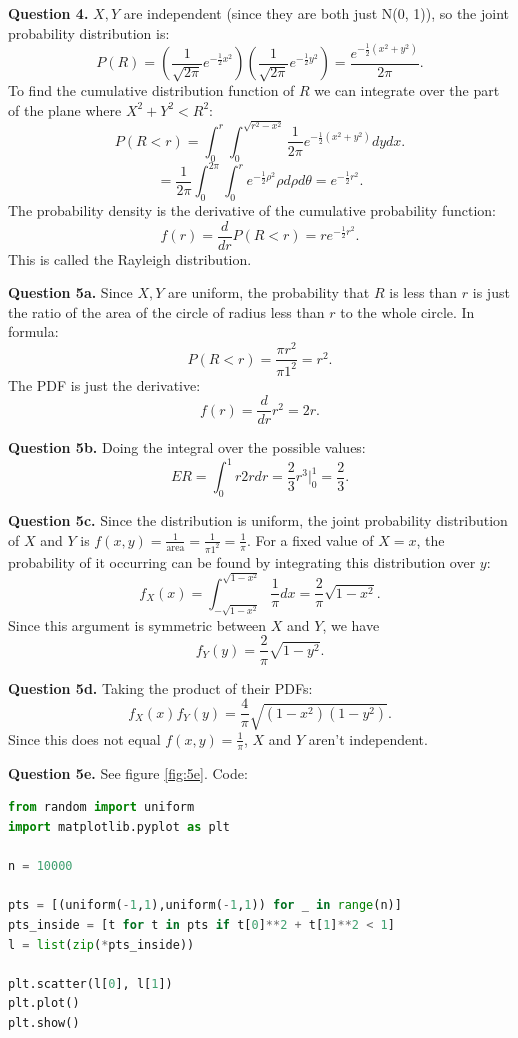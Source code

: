 \documentclass[letterpaper, reqno,11pt]{article}
\begin{document}
{\medskip\noindent\bf Question 4.} $X,Y$ are independent (since they are both just N(0, 1)), so the joint probability distribution is: 
\[
    P(R)=\left(\frac{1}{\sqrt{2\pi} }e^{-\frac{1}{2}x^2}\right)\left(\frac{1}{\sqrt{2\pi} }e^{-\frac{1}{2}y^2}\right)=\frac{e^{-\frac{1}{2}(x^2+y^2)}}{2\pi}
.\]
To find the cumulative distribution function of $R$ we can integrate over the part of the plane where $X^2+Y^2<R^2$: 
\[
    P(R<r)=\int_0^{r}\int_0^{\sqrt{ r^2-x^2}}\frac{1}{2\pi}e^{-\frac{1}{2}\left( x^2+y^2 \right) }dydx
.\]
\[
    =\frac{1}{2\pi}\int_0^{2\pi}\int_0^{r}e^{-\frac{1}{2}\rho^2}\rho d\rho d\theta=e^{-\frac{1}{2}r^2}
.\]
The probability density is the derivative of the cumulative probability function: 
\[
f(r)=\frac{d}{dr}P(R<r)=re^{-\frac{1}{2}r^2}
.\]
This is called the Rayleigh distribution. 

{\medskip\noindent\bf Question 5a.} Since $X,Y$ are uniform, the probability that $R$ is less than $r$ is just the ratio of the area of the circle of radius less than $r$ to the whole circle. In formula: 
\[
P(R<r)=\frac{\pi r^2}{\pi 1^2}=r^2
.\]
The PDF is just the derivative:
\[
f(r)=\frac{d}{dr} r^2=2r
.\]

{\medskip\noindent\bf Question 5b.} Doing the integral over the possible values: 
\[
ER=\int_0^{1}r 2r dr=\frac{2}{3}r^{3}\bigg|_0^{1}=\frac{2}{3}
.\]

{\medskip\noindent\bf Question 5c.} Since the distribution is uniform, the joint probability distribution of $X$ and $Y$ is $f(x, y)=\frac{1}{\text{area}}=\frac{1}{\pi 1^2}=\frac{1}{\pi}$. For a fixed value of $X=x$, the probability of it occurring can be found by integrating this distribution over $y$: 
\[
f_X(x)=\int_{-\sqrt{1-x^2} }^{\sqrt{1-x^2} }\frac{1}{\pi}dx=\frac{2}{\pi}\sqrt{1-x^2} 
.\]
Since this argument is symmetric between $X$ and $Y$, we have 
\[
f_Y(y)=\frac{2}{\pi}\sqrt{1-y^2}
.\]

{\medskip\noindent\bf Question 5d.} Taking the product of their PDFs: 
\[
f_X(x)f_Y(y)=\frac{4}{\pi}\sqrt{(1-x^2)(1-y^2)}
.\]
Since this does not equal $f(x,y)=\frac{1}{\pi}$, $X$ and $Y$ aren't independent. 

{\medskip\noindent\bf Question 5e.} See figure \ref{fig:5e}. Code: 

\begin{lstlisting}[language=Python]
from random import uniform
import matplotlib.pyplot as plt

n = 10000

pts = [(uniform(-1,1),uniform(-1,1)) for _ in range(n)]
pts_inside = [t for t in pts if t[0]**2 + t[1]**2 < 1]
l = list(zip(*pts_inside))

plt.scatter(l[0], l[1])
plt.plot()
plt.show()
\end{lstlisting}
\end{document}
